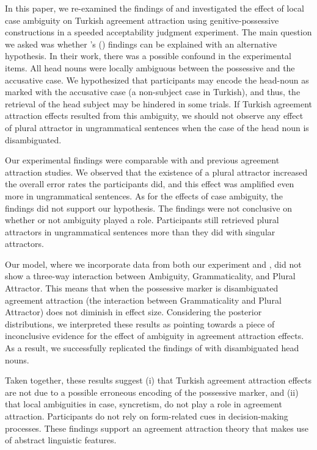 \documentclass[times,linguex]{glossa}\usepackage[]{graphicx}\usepackage[]{color}
\begin{document}
In this paper, we re-examined the findings of \citet{LagoEtAl:2018} and investigated the effect of local case ambiguity on Turkish agreement attraction using genitive-possessive constructions in a speeded acceptability judgment experiment. The main question we asked was whether \citeauthor{LagoEtAl:2018}'s (\citeyear{LagoEtAl:2018}) findings can be explained with an alternative hypothesis. In their work, there was a possible confound in the experimental items. All head nouns were locally ambiguous between the possessive and the accusative case. We hypothesized that participants may encode the head-noun as marked with the accusative case (a non-subject case in Turkish), and thus, the retrieval of the head subject may be hindered in some trials. If Turkish agreement attraction effects resulted from this ambiguity, we should not observe any effect of plural attractor in ungrammatical sentences when the case of the head noun is disambiguated.      
  
Our experimental findings were comparable with \citet{LagoEtAl:2018} and previous agreement attraction studies. We observed that the existence of a plural attractor increased the overall error rates the participants did, and this effect was amplified even more in ungrammatical sentences. As for the effects of case ambiguity, the findings did not support our hypothesis. The findings were not conclusive on whether or not ambiguity played a role. Participants still retrieved plural attractors in ungrammatical sentences more than they did with singular attractors. 
  
Our model, where we incorporate data from both our experiment and \citet{LagoEtAl:2018}, did not show a three-way interaction between Ambiguity, Grammaticality, and Plural Attractor. This means that when the possessive marker is disambiguated agreement attraction (the interaction between Grammaticality and Plural Attractor) does not diminish in effect size. Considering the posterior distributions, we interpreted these results as pointing towards a piece of inconclusive evidence for the effect of ambiguity in agreement attraction effects. As a result, we successfully replicated the findings of \citet{LagoEtAl:2018} with disambiguated head nouns. 
  
Taken together, these results suggest (i) that Turkish agreement attraction effects are not due to a possible erroneous encoding of the possessive marker, and (ii) that local ambiguities in case, syncretism, do not play a role in agreement attraction. Participants do not rely on form-related cues in decision-making processes. These findings support an agreement attraction theory that makes use of abstract linguistic features.
  
  
  

\end{document}
